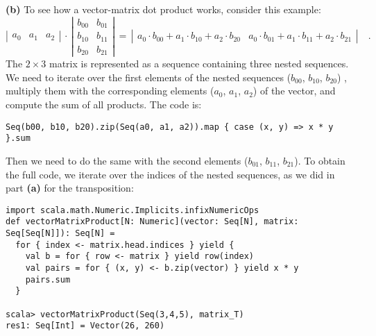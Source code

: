 \textbf{(b)} To see how a vector-matrix dot product
works, consider this example:
\[
\left|\begin{array}{ccc}
a_{0} & a_{1} & a_{2}\end{array}\right|\,\cdot\,\left|\begin{array}{cc}
b_{00} & b_{01}\\
b_{10} & b_{11}\\
b_{20} & b_{21}
\end{array}\right|\,=\,\left|\begin{array}{cc}
a_{0}\cdot b_{00}+a_{1}\cdot b_{10}+a_{2}\cdot b_{20} & a_{0}\cdot b_{01}+a_{1}\cdot b_{11}+a_{2}\cdot b_{21}\end{array}\right|\quad.
\]
The $2\times3$ matrix is represented as a sequence containing three
nested sequences. We need to iterate over the first elements of the
nested sequences ($b_{00}$, $b_{10}$, $b_{20}$) , multiply them
with the corresponding elements ($a_{0}$, $a_{1}$, $a_{2}$) of
the vector, and compute the sum of all products. The code is:
\begin{lstlisting}
Seq(b00, b10, b20).zip(Seq(a0, a1, a2)).map { case (x, y) => x * y }.sum
\end{lstlisting}
Then we need to do the same with the second elements ($b_{01}$, $b_{11}$,
$b_{21}$). To obtain the full code, we iterate over the indices of
the nested sequences, as we did in part \textbf{(a)} for the transposition:
\begin{lstlisting}
import scala.math.Numeric.Implicits.infixNumericOps
def vectorMatrixProduct[N: Numeric](vector: Seq[N], matrix: Seq[Seq[N]]): Seq[N] =
  for { index <- matrix.head.indices } yield {
    val b = for { row <- matrix } yield row(index)
    val pairs = for { (x, y) <- b.zip(vector) } yield x * y 
    pairs.sum
  }

scala> vectorMatrixProduct(Seq(3,4,5), matrix_T)
res1: Seq[Int] = Vector(26, 260)
\end{lstlisting}

